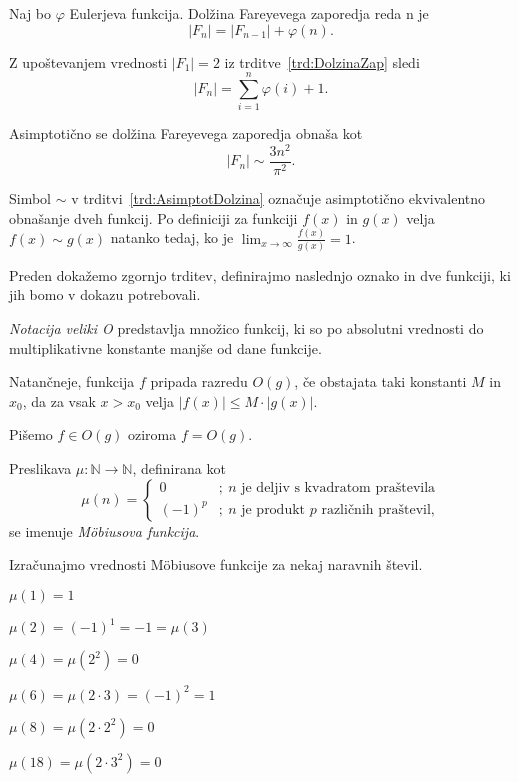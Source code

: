 \documentclass[mat1]{fmfdelo}
\begin{document}
\begin{trditev}
\label{trd:DolzinaZap}
Naj bo $\varphi$ Eulerjeva funkcija. Dolžina Fareyevega zaporedja reda n je
\[  |F_{n}| = |F_{n-1}| + \varphi(n). \]
\end{trditev}

\begin{opomba}
\label{op:AsimptotDolzina}
Z upoštevanjem vrednosti $|F_{1}| = 2$ iz trditve~\ref{trd:DolzinaZap} sledi \[  |F_{n}| = \sum_{i=1}^n \varphi(i) + 1. \]
\end{opomba}

\begin{trditev}
\label{trd:AsimptotDolzina}
Asimptotično se dolžina Fareyevega zaporedja obnaša kot
\[  |F_{n}|\sim\frac{3n^2}{\pi^2}. \]
\end{trditev}

\begin{opomba}
Simbol $\sim$ v trditvi~\ref{trd:AsimptotDolzina} označuje asimptotično ekvivalentno obnašanje dveh funkcij.
Po definiciji za funkciji $f(x)$ in $g(x)$ velja $f(x) \sim g(x)$ natanko tedaj, ko je $ \lim_{x \to \infty} \frac{f(x)}{g(x)} = 1$.
\end{opomba}

%
Preden dokažemo zgornjo trditev, definirajmo naslednjo oznako in dve funkciji, ki jih bomo v dokazu potrebovali.

\begin{definicija}
\emph{Notacija veliki O} predstavlja množico funkcij, ki so po absolutni vrednosti do multiplikativne konstante manjše od dane funkcije.

Natančneje, funkcija $f$ pripada razredu $O(g)$, če obstajata taki konstanti $M$ in $x_{0}$, da za vsak $x > x_{0}$ velja $|f(x)| \leq M \cdot |g(x)|$.

Pišemo $f \in O(g)$ oziroma $f = O(g)$.
\end{definicija}

\begin{definicija}
Preslikava \( \mu\colon \mathbb{N} \to \mathbb{N} \), definirana kot
\[
\mu(n) = \left\{
\begin{array}{rl}
0 & ;\ \mbox{$n$ je deljiv s kvadratom praštevila}\\
(-1)^p & ;\  \mbox{$n$ je produkt $p$ različnih praštevil,}
\end{array}
\right.
\]
se imenuje \emph{M\"obiusova funkcija}.
\end{definicija}

\begin{primer}
Izračunajmo vrednosti M\"obiusove funkcije za nekaj naravnih števil.

\( \mu(1)=1 \)

\( \mu(2)=(-1)^{1}=-1=\mu(3) \)

\( \mu(4)=\mu(2^{2})=0 \)

\( \mu(6)=\mu(2\cdot3)=(-1)^{2}=1 \)

\( \mu(8)=\mu(2\cdot2^{2})=0 \)

\( \mu(18)=\mu(2\cdot3^{2})=0 \)
\end{primer}
\end{document}

